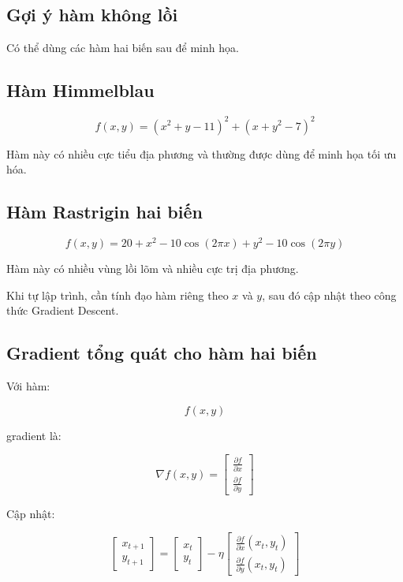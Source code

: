 \subsection{Gợi ý hàm không lồi}

Có thể dùng các hàm hai biến sau để minh họa.

\subsection{Hàm Himmelblau}

\[
    f(x,y)
    =
    (x^2+y-11)^2
    +
    (x+y^2-7)^2
\]

Hàm này có nhiều cực tiểu địa phương và thường được dùng để minh họa tối ưu hóa.

\subsection{Hàm Rastrigin hai biến}

\[
    f(x,y)
    =
    20
    +
    x^2
    -
    10\cos(2\pi x)
    +
    y^2
    -
    10\cos(2\pi y)
\]

Hàm này có nhiều vùng lồi lõm và nhiều cực trị địa phương.

\begin{luuy}
Khi tự lập trình, cần tính đạo hàm riêng theo $x$ và $y$, sau đó cập nhật theo công thức Gradient Descent.
\end{luuy}

\subsection{Gradient tổng quát cho hàm hai biến}

Với hàm:

\[
    f(x,y)
\]

gradient là:

\[
    \nabla f(x,y)
    =
    \begin{bmatrix}
    \frac{\partial f}{\partial x}\\
    \frac{\partial f}{\partial y}
    \end{bmatrix}
\]

Cập nhật:

\[
    \begin{bmatrix}
    x_{t+1}\\
    y_{t+1}
    \end{bmatrix}
    =
    \begin{bmatrix}
    x_t\\
    y_t
    \end{bmatrix}
    -
    \eta
    \begin{bmatrix}
    \frac{\partial f}{\partial x}(x_t,y_t)\\
    \frac{\partial f}{\partial y}(x_t,y_t)
    \end{bmatrix}
\]

